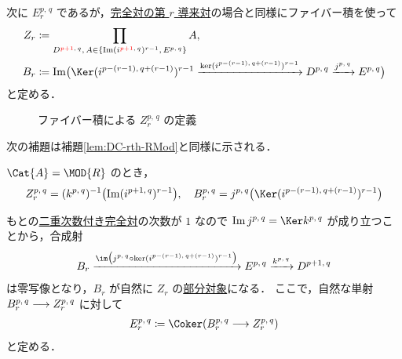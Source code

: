 \documentclass[algtopo_main]{subfiles}
\begin{document}
次に $E_r^{p,\, q}$ であるが，\hyperref[prop:DC-rth]{完全対の第 $r$ 導来対}の場合と同様にファイバー積を使って
\begin{align}
    Z_r &\coloneqq \prod_{D^{\textcolor{red}{p+1},\, q},\, A \in \{\Im (i^{\textcolor{red}{p+1},\, q})^{r-1},\, E^{p,\, q}\}} A, \\
    B_r &\coloneqq \Im \bigl( \Ker (i^{p-(r-1),\, q+(r-1)})^{r-1} \xrightarrow{\ker (i^{p-(r-1),\, q+(r-1)})^{r-1}} D^{p,\, q} \xrightarrow{j^{p,\, q}} E^{p,\, q}\bigr) 
\end{align}
と定める．
\begin{figure}[H]
    \centering
    \caption{ファイバー積による $Z_r^{p,\, q}$ の定義}
    \label{cmtd:DC-fiber}
\end{figure}%

次の補題は補題\ref{lem:DC-rth-RMod}と同様に示される．
\begin{mylem}[label=lem:DC-rth-RMod]{}
    $\Cat{A} = \MOD{R}$ のとき，
    \begin{align}
        Z_r^{p,\, q} = (k^{p,\, q})^{-1}\bigl(\Im (i^{p+1,\, q})^{r-1}\bigr),\quad B_r^{p,\, q} = j^{p,\, q} \bigl(\Ker (i^{p-(r-1),\, q+(r-1)})^{r-1}\bigr)
    \end{align}
\end{mylem}

もとの\hyperref[def:BEC]{二重次数付き完全対}の次数が $1$ なので $\Im j^{p,\, q} = \Ker k^{p,\, q}$ が成り立つことから，合成射
\begin{align}
    B_r \xrightarrow{\im \bigl(j^{p,\, q} \circ \ker (i^{p-(r-1),\, q+(r-1)})^{r-1}\bigr)} E^{p,\, q} \xrightarrow{k^{p,\, q}} D^{p+1,\, q}
\end{align}
は零写像となり，$B_r$ が自然に $Z_r$ の\hyperref[def:sub]{部分対象}になる．
ここで，自然な単射 $B^{p,\, q}_r \longrightarrow Z^{p,\, q}_r$ に対して
\begin{align}
    E^{p,\, q}_r \coloneqq \Coker (B^{p,\, q}_r \lto Z^{p,\, q}_r)
\end{align}
と定める．
\end{document}
